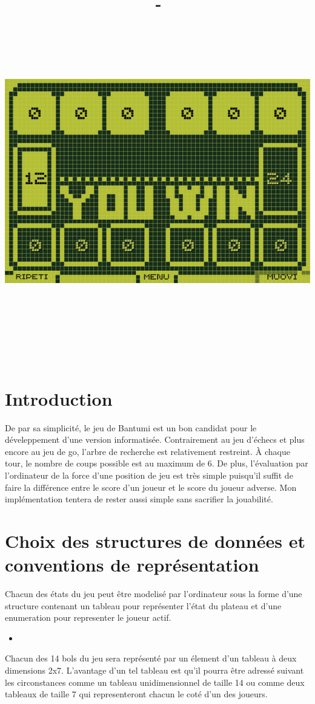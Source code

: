 \documentclass{article}
\title{
\vspace{0.2in}\large\textsc{\hmwkLaboratory}\\
\vspace{0.8in}
\huge{\textbf{\hmwkClass}}\\
\vspace{0.1in}\textit{-}\\
\vspace{0.1in}\Huge{\textit{\hmwkProject}}\\
\vspace{0.5in}\Large{\textbf{\hmwkPhase}}\\
\vspace{0.4in}
\begin{center}
\includegraphics[width=0.3\columnwidth]{bantumi} %
\end{center}
\vspace{0.8in}\LARGE{\hmwkAuthorName}\\
\Large\vspace{1in}{\hmwkYear}\\
\vspace{0.3in}
}
\author{}
\date{}
\newcommand{\cscript}[2]{
\begin{itemize}
\item[]
\end{itemize}
}
\begin{document}
\maketitle
\newpage
\tableofcontents
\newpage


\section{Introduction}

De par sa simplicit\'e, le jeu de Bantumi est un bon candidat pour le d\'eveleppement d'une version informatis\'ee. Contrairement au jeu d'\'echecs et plus encore au jeu de go, l'arbre de recherche est relativement restreint. \`A chaque tour, le nombre de coups possible est au maximum de 6. De plus, l'\'evaluation par l'ordinateur de la force d'une position de jeu est tr\`es simple puisqu'il suffit de faire la diff\'erence entre le score d'un joueur et le score du joueur adverse. Mon impl\'ementation tentera de rester aussi simple sans sacrifier la jouabilit\'e.

\section{Choix des structures de donn\'{e}es et conventions de repr\'esentation}

Chacun des \'etats du jeu peut \^etre modelis\'e par l'ordinateur sous la forme d'une structure contenant un tableau  pour repr\'esenter l'\'etat du plateau et d'une enumeration pour representer le joueur actif.

\cscript{struct}{Structure repr\'esentant l'\'etat du jeu}

Chacun des 14 bols du jeu sera repr\'esent\'e par un \'element d'un tableau \`a deux dimensions 2x7. L'avantage d'un tel tableau est qu'il pourra \^etre adress\'e suivant les circonstances comme un tableau unidimensionnel de taille 14 ou comme deux tableaux de taille 7 qui representeront chacun le cot\'e d'un des joueurs. 
\end{document}
